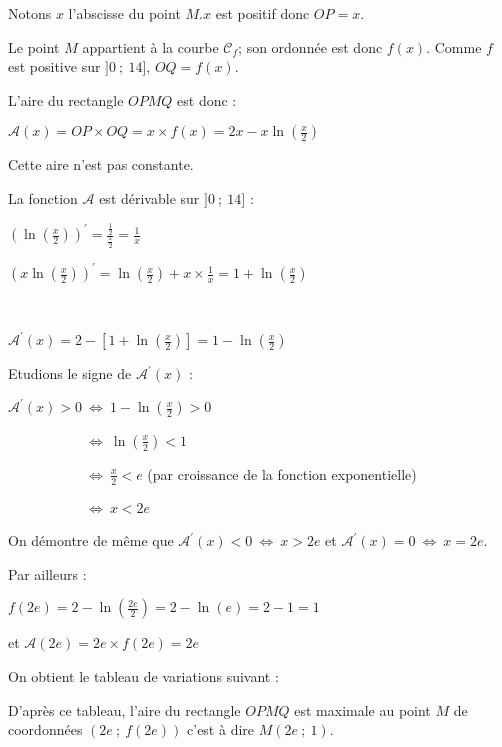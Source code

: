 \begin{corrige}
     Notons $x$ l'abscisse du point $M$.$x$ est positif donc $OP=x$.
     \par
     Le point $M$ appartient à la courbe $\mathscr C_f$; son ordonnée est donc $f(x)$. Comme $f$ est positive sur $]0~;~14]$, $OQ=f(x)$.
     \par
     L'aire du rectangle $OPMQ$ est donc :
     \par
     $\mathscr A(x)=OP \times OQ $$=x \times f(x) = 2x-x\ln \left(\frac{x}{2}\right)$
     \par
     Cette aire n'est pas constante.
     \par
     La fonction $\mathscr A$ est dérivable sur $]0~;~14]$ :
     \par
     $\left(\ln \left(\frac{x}{2}\right) \right) ^{\prime} = \frac{\frac{1}{2}}{\frac{x}{2}}=\frac{1}{x}$
     \par
     $\left(x\ln \left(\frac{x}{2}\right) \right) ^{\prime} =  \ln \left(\frac{x}{2}\right) + x \times \frac{1}{x} = 1 + \ln \left(\frac{x}{2}\right) $
     \par
     ~
     \par
     $\mathscr A^{\prime}(x)=2-\left[1 +  \ln \left(\frac{x}{2}\right)\right]=1-\ln \left(\frac{x}{2}\right)$
     \par
     Etudions le signe de $\mathscr A^{\prime}(x)$ :
     \par
     $\mathscr A^{\prime}(x)  >  0 \ \Leftrightarrow \ 1-\ln \left(\frac{x}{2}\right)  >  0$
     \par
     $\phantom{\mathscr A^{\prime}(x)  >  0 \ }\Leftrightarrow \ \ln \left(\frac{x}{2}\right)  <  1$
     \par
     $\phantom{\mathscr A^{\prime}(x)  >  0 \ }\Leftrightarrow \ \frac{x}{2}  <  e$ (par croissance de la fonction exponentielle)
     \par
     $\phantom{\mathscr A^{\prime}(x)  >  0 \ }\Leftrightarrow \ x  <  2e$
     \par
     On démontre de même que $\mathscr A^{\prime}(x)  <  0 \ \Leftrightarrow \ x  >  2e$ et $\mathscr A^{\prime}(x)  =  0 \ \Leftrightarrow \ x  =  2e$.
     \par
     Par ailleurs :
     \par
     $f(2e)=2-\ln\left(\frac{2e}{2}\right)=2-\ln(e)=2-1=1$
     \par
     et $\mathscr A(2e)=2e \times f(2e)=2e$
     \par
     On obtient le tableau de variations suivant :

\begin{center}


\end{center}
    
     D'après ce tableau, l'aire du rectangle $OPMQ$ est maximale au point $M$ de coordonnées $(2e~;~f(2e))$ c'est à dire $M(2e~;~1)$.
\end{corrige}
